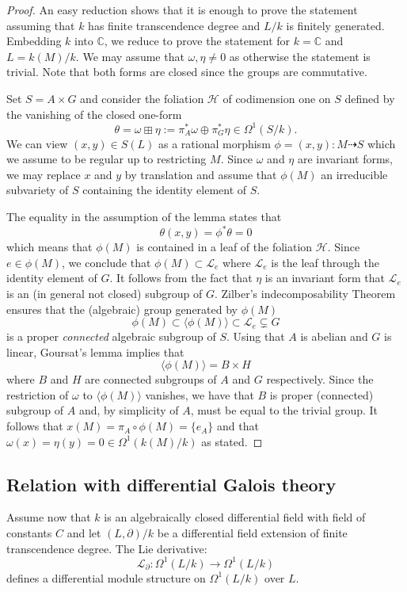 \documentclass[12pt]{amsart}
\theoremstyle{definition}
\theoremstyle{plain}
\theoremstyle{exampstyle}\newtheorem{thmx}{Theorem}
\theoremstyle{exampstyle}\newtheorem{thmxbis}{Theorem}
\begin{document}
\begin{proof} 
An easy reduction shows that it is enough to prove the statement assuming that $k$ has finite transcendence degree and $L/k$ is finitely generated. Embedding $k$ into $\mathbb{C}$, we reduce  to prove the statement for $k = \mathbb{C}$ and $L = k(M)/k$. We may assume that $\omega,\eta \neq 0$ as otherwise the statement is trivial. Note that both forms are closed since the groups are commutative. 

Set $S = A \times G$ and consider the foliation $\mathcal H$ of codimension one on $S$ defined by the vanishing of the closed one-form
$$ \theta = \omega \boxplus \eta := \pi^\ast_A \omega  \oplus \pi^\ast_G \eta \in \Omega^1(S/k).$$
We  can view $(x,y) \in S(L)$ as a rational morphism $\phi = (x,y): M \dashrightarrow S$ which we assume to be regular up to restricting $M$. Since $\omega$ and $\eta$ are invariant forms, we may replace $x$ and $y$ by translation and assume that $\phi(M)$  an irreducible subvariety of $S$ containing the identity element of $S$. 

The equality in the assumption of the lemma states that $$\theta(x,y) = \phi^\ast \theta = 0$$ which means that $\phi(M)$ is contained in a leaf of the foliation $\mathcal H$. Since $e \in \phi(M)$, we conclude that $\phi(M) \subset \mathcal L_e$ where $\mathcal L_e$ is the leaf through the identity element of $G$. It follows from the fact that $\eta$ is an invariant form that $\mathcal L_e$ is an (in general not closed) subgroup of $G$. Zilber's indecomposability Theorem ensures that the (algebraic) group generated by $\phi(M)$
$$ \phi(M) \subset \langle \phi(M) \rangle \subset \mathcal L_e \subsetneq G $$
is a proper {\em connected} algebraic subgroup of $S$. Using that $A$ is abelian and $G$ is linear,  Goursat's lemma implies that  
$$\langle \phi(M) \rangle = B \times H$$ 
where $B$ and $H$ are connected subgroups of $A$ and $G$  respectively. Since the restriction of $\omega$ to $\langle \phi(M) \rangle$ vanishes, we have that $B$ is proper (connected) subgroup of $A$ and, by simplicity of $A$, must be equal to the trivial group.  It follows that $x(M) = \pi_A \circ \phi(M) = \lbrace e_A \rbrace$ and that $\omega(x) = \eta(y) = 0 \in \Omega^1(k(M)/k)$ as stated.
 \end{proof}







\subsection{Relation with differential Galois theory} Assume now that $k$ is an algebraically closed differential field with field of constants $C$ and let $(L,\partial)/k$ be a differential field extension of finite transcendence degree. The Lie derivative: 
$$ \mathcal L_\partial : \Omega^1(L/k) \rightarrow \Omega^1(L/k) $$
defines a differential module structure on $\Omega^1(L/k)$ over $L$. 
\end{document}

